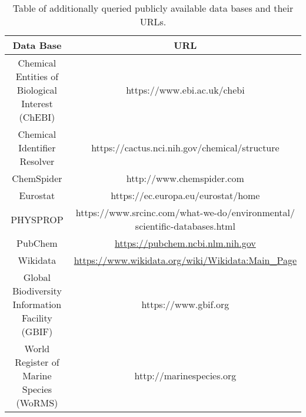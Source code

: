\begin{table}[ht]
  \caption{Table of additionally queried publicly available data bases and their URLs.}
  \label{tab:data-base-additional}
  \centering
\begin{tabular}{cc}
  \hline
  Data Base & URL \\ 
  \hline
  \makecell{Chemical Entities of \\ Biological Interest (ChEBI)} & https://www.ebi.ac.uk/chebi  \\
  Chemical Identifier Resolver & https://cactus.nci.nih.gov/chemical/structure  \\[0.5cm]
  ChemSpider & http://www.chemspider.com    \\[0.5cm]
  Eurostat & https://ec.europa.eu/eurostat/home \\[0.5cm]
  PHYSPROP & \makecell{https://www.srcinc.com/what-we-do/environmental/\\scientific-databases.html}  \\[0.5cm]
  PubChem & \url{https://pubchem.ncbi.nlm.nih.gov} \\[0.5cm]
  Wikidata & \url{https://www.wikidata.org/wiki/Wikidata:Main_Page} \\[0.5cm]
  \makecell{Global Biodiversity \\ Information Facility (GBIF)} & https://www.gbif.org \\[0.5cm]
  \makecell{World Register of \\ Marine Species (WoRMS)} & http://marinespecies.org \\
  \hline
\end{tabular}
\end{table}
